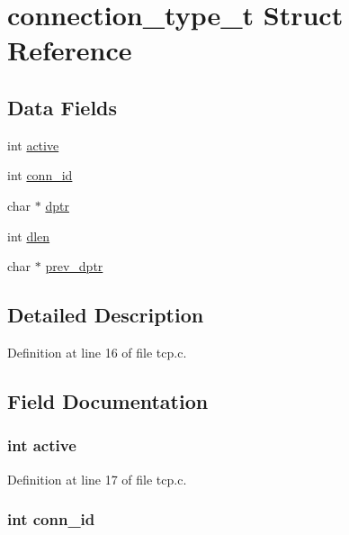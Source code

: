 \hypertarget{structconnection__type__t}{\section{connection\-\_\-type\-\_\-t Struct Reference}
\label{structconnection__type__t}
}
\subsection*{Data Fields}
\begin{DoxyCompactItemize}
\item 
int \hyperlink{structconnection__type__t_aa5805c5e936174e5092bf7a5b78e7e64}{active}
\item 
int \hyperlink{structconnection__type__t_a11be20eefd18549b1a7b6b2f1d7dca52}{conn\-\_\-id}
\item 
char $\ast$ \hyperlink{structconnection__type__t_a2d9df43d157669dbcc90879f8ee350ff}{dptr}
\item 
int \hyperlink{structconnection__type__t_a142672f9be33d53e1ecf96db7104a396}{dlen}
\item 
char $\ast$ \hyperlink{structconnection__type__t_a3950706000f1bfe0b448d9b632624521}{prev\-\_\-dptr}
\end{DoxyCompactItemize}


\subsection{Detailed Description}


Definition at line 16 of file tcp.\-c.



\subsection{Field Documentation}
\hypertarget{structconnection__type__t_aa5805c5e936174e5092bf7a5b78e7e64}{
\subsubsection[{active}]{\setlength{\rightskip}{0pt plus 5cm}int active}}\label{structconnection__type__t_aa5805c5e936174e5092bf7a5b78e7e64}


Definition at line 17 of file tcp.\-c.

\hypertarget{structconnection__type__t_a11be20eefd18549b1a7b6b2f1d7dca52}{
\subsubsection[{conn\-\_\-id}]{\setlength{\rightskip}{0pt plus 5cm}int conn\-\_\-id}}\label{structconnection__type__t_a11be20eefd18549b1a7b6b2f1d7dca52}


